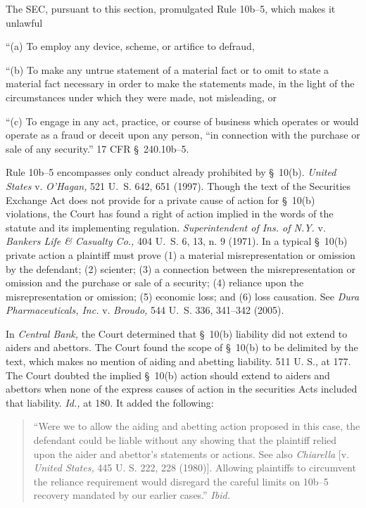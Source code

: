 \noindent The SEC, pursuant to this section, promulgated Rule 10b--5, which makes it unlawful

      ``(a) To employ any device, scheme, or artifice to defraud,

      ``(b) To make any untrue statement of a material fact or to omit to state a material fact necessary in order to make the statements made, in the light of the circumstances under which they were made, not misleading, or

      \newpage  ``(c) To engage in any act, practice, or course of business which operates or would operate as a fraud or deceit upon any person, ``in connection with the purchase or sale of any security.'' 17 CFR \S~240.10b--5.

\noindent Rule 10b--5 encompasses only conduct already prohibited by \S~10(b). \emph{United States} v. \emph{O'Hagan,} 521 U.~S. 642, 651 (1997). Though the text of the Securities Exchange Act does not provide for a private cause of action for \S~10(b) violations, the Court has found a right of action implied in the words of the statute and its implementing regulation. \emph{Superintendent of Ins. of N.Y.} v. \emph{Bankers Life \& Casualty Co.,} 404 U.~S. 6, 13, n. 9 (1971). In a typical \S~10(b) private action a plaintiff must prove (1) a material misrepresentation or omission by the defendant; (2) scienter; (3) a connection between the misrepresentation or omission and the purchase or sale of a security; (4) reliance upon the misrepresentation or omission; (5) economic loss; and (6) loss causation. See \emph{Dura Pharmaceuticals, Inc.} v. \emph{Broudo,} 544 U.~S. 336, 341--342 (2005).

  In \emph{Central Bank,} the Court determined that \S~10(b) liability did not extend to aiders and abettors. The Court found the scope of \S~10(b) to be delimited by the text, which makes no mention of aiding and abetting liability. 511 U. S., at 177. The Court doubted the implied \S~10(b) action should extend to aiders and abettors when none of the express causes of action in the securities Acts included that liability. \emph{Id.,} at 180. It added the following:

    \begin{quote}

		``Were we to allow the aiding and abetting action proposed in this case, the defendant could be liable without any showing that the plaintiff relied upon the aider and abettor's statements or actions. See also \emph{Chiarella} [v. \emph{United States,} 445 U. S. 222, 228 (1980)]. Allowing plaintiffs to circumvent the reliance requirement would disregard the careful limits on 10b--5 recovery mandated by our earlier cases.'' \emph{Ibid.}\newpage 

    \end{quote}

